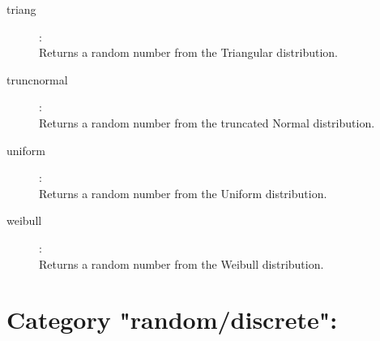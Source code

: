 \begin{description}
\item[triang]:  \\
    Returns a random number from the Triangular distribution.

\item[truncnormal]:  \\
    Returns a random number from the truncated Normal distribution.

\item[uniform]:  \\
    Returns a random number from the Uniform distribution.

\item[weibull]:  \\
    Returns a random number from the Weibull distribution.


\end{description}

\section{Category "random/discrete":}
\label{sec:ned-functions:category-random-discrete}

